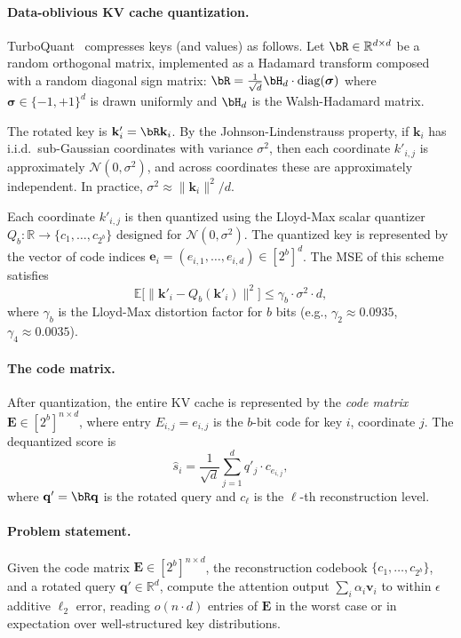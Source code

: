 \documentclass[10pt,twocolumn]{article}
\theoremstyle{definition}
\newcommand{\R}{\mathbb{R}}
\newcommand{\E}{\mathbb{E}}
\newcommand{\calN}{\mathcal{N}}
\newcommand{\bq}{\mathbf{q}}
\newcommand{\bk}{\mathbf{k}}
\newcommand{\bv}{\mathbf{v}}
\begin{document}
\paragraph{Data-oblivious KV cache quantization.}
TurboQuant~\cite{turboquant2025} compresses keys (and values) as follows.  Let
$\bR \in \R^{d \times d}$ be a random orthogonal matrix, implemented as a
Hadamard transform composed with a random diagonal sign matrix:
$\bR = \frac{1}{\sqrt{d}} \bH_d \cdot \mathrm{diag}(\bm{\sigma})$ where
$\bm{\sigma} \in \{-1,+1\}^d$ is drawn uniformly and $\bH_d$ is the
Walsh-Hadamard matrix.

The rotated key is $\bk'_i = \bR \bk_i$.  By the Johnson-Lindenstrauss
property, if $\bk_i$ has i.i.d.\ sub-Gaussian coordinates with variance
$\sigma^2$, then each coordinate $k'_{i,j}$ is approximately
$\calN(0, \sigma^2)$, and across coordinates these are approximately
independent.  In practice, $\sigma^2 \approx \|\bk_i\|^2 / d$.

Each coordinate $k'_{i,j}$ is then quantized using the Lloyd-Max scalar
quantizer $Q_b : \R \to \{c_1, \ldots, c_{2^b}\}$ designed for $\calN(0,
\sigma^2)$.  The quantized key is represented by the vector of code indices
$\mathbf{e}_i = (e_{i,1}, \ldots, e_{i,d}) \in [2^b]^d$.  The MSE of this
scheme satisfies
\begin{equation}
  \label{eq:mse}
  \E\bigl[\|\bk'_i - Q_b(\bk'_i)\|^2\bigr]
    \leq \gamma_b \cdot \sigma^2 \cdot d,
\end{equation}
where $\gamma_b$ is the Lloyd-Max distortion factor for $b$ bits (e.g.,
$\gamma_2 \approx 0.0935$, $\gamma_4 \approx 0.0035$).

\paragraph{The code matrix.}
After quantization, the entire KV cache is represented by the \emph{code matrix}
$\mathbf{E} \in [2^b]^{n \times d}$, where entry $E_{i,j} = e_{i,j}$ is the
$b$-bit code for key $i$, coordinate $j$.  The dequantized score is
\begin{equation}
  \label{eq:dequant_score}
  \hat{s}_i = \frac{1}{\sqrt{d}} \sum_{j=1}^d q'_j \cdot c_{e_{i,j}},
\end{equation}
where $\bq' = \bR \bq$ is the rotated query and $c_\ell$ is the $\ell$-th
reconstruction level.

\paragraph{Problem statement.}
Given the code matrix $\mathbf{E} \in [2^b]^{n \times d}$, the reconstruction
codebook $\{c_1, \ldots, c_{2^b}\}$, and a rotated query $\bq' \in \R^d$,
compute the attention output $\sum_i \alpha_i \bv_i$ to within $\epsilon$
additive $\ell_2$ error, reading $o(n \cdot d)$ entries of $\mathbf{E}$ in the
worst case or in expectation over well-structured key distributions.
\end{document}
